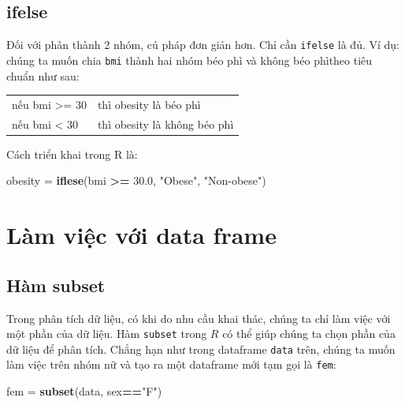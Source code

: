 \documentclass[
]{book}
\newenvironment{Shaded}{\begin{snugshade}}{\end{snugshade}}
\newcommand{\FloatTok}[1]{\textcolor[rgb]{0.00,0.00,0.81}{#1}}
\newcommand{\KeywordTok}[1]{\textcolor[rgb]{0.13,0.29,0.53}{\textbf{#1}}}
\newcommand{\NormalTok}[1]{#1}
\newcommand{\OperatorTok}[1]{\textcolor[rgb]{0.81,0.36,0.00}{\textbf{#1}}}
\newcommand{\StringTok}[1]{\textcolor[rgb]{0.31,0.60,0.02}{#1}}
\begin{document}
\hypertarget{ifelse}{%
\subsection*{ifelse}\label{ifelse}}

Đối với phân thành 2 nhóm, cú pháp đơn giản hơn. Chỉ cần \texttt{ifelse} là đủ. Ví dụ: chúng ta muốn chia \texttt{bmi} thành hai nhóm béo phì và không béo phìtheo tiêu chuẩn như sau:

\begin{longtable}[]{@{}ll@{}}
\toprule
\endhead
nếu bmi \textgreater= 30 & thì obesity là béo phì\tabularnewline
nếu bmi \textless{} 30 & thì obesity là không béo phì\tabularnewline
\bottomrule
\end{longtable}

Cách triển khai trong R là:

\begin{Shaded}
\begin{Highlighting}[]
\NormalTok{obesity =}\StringTok{ }\KeywordTok{iflese}\NormalTok{(bmi }\OperatorTok{\textgreater{}=}\StringTok{ }\FloatTok{30.0}\NormalTok{, }\StringTok{"Obese"}\NormalTok{, }\StringTok{"Non{-}obese"}\NormalTok{)}
\end{Highlighting}
\end{Shaded}

\hypertarget{luxe0m-viux1ec7c-vux1edbi-data-frame}{%
\section{Làm việc với data frame}\label{luxe0m-viux1ec7c-vux1edbi-data-frame}}

\hypertarget{huxe0m-subset}{%
\subsection{Hàm subset}\label{huxe0m-subset}}

Trong phân tích dữ liệu, có khi do nhu cầu khai thác, chúng ta chỉ làm việc với một phần của dữ liệu. Hàm \texttt{subset} trong \(R\) có thể giúp chúng ta chọn phần của dữ liệu để phân tích. Chẳng hạn như trong dataframe \texttt{data} trên, chúng ta muốn làm việc trên nhóm nữ và tạo ra một dataframe mới tạm gọi là \texttt{fem}:

\begin{Shaded}
\begin{Highlighting}[]
\NormalTok{fem =}\StringTok{ }\KeywordTok{subset}\NormalTok{(data, sex}\OperatorTok{==}\StringTok{"F"}\NormalTok{)}
\end{Highlighting}
\end{Shaded}
\end{document}
